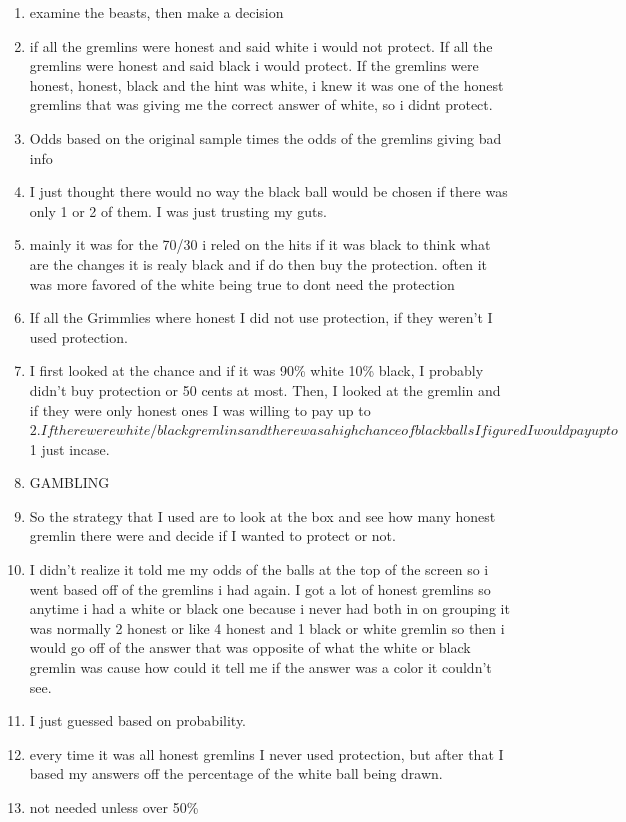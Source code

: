 \documentclass[12pt,a4paper]{article}
\begin{document}
\begin{appendices}
\begin{enumerate}
\item examine the beasts, then make a decision
\item if all the gremlins were honest and said white i would not protect. If all the gremlins were honest and said black i would protect. If the gremlins were honest, honest, black and the hint was white, i knew it was one of the honest gremlins that was giving me the correct answer of white, so i didnt protect.
\item Odds based on the original sample times the odds of the gremlins giving bad info
\item I just thought there would no way the black ball would be chosen if there was only 1 or 2 of them. I was just trusting my guts. 
\item mainly it was for the 70/30 i reled on the hits if it was black to think what are the changes it is realy black and if do then buy the protection. often it was more favored of the white being true to dont need the protection
\item If all the Grimmlies where honest I did not use protection, if they weren't I used protection. 
\item I first looked at the chance and if it was 90\% white 10\% black, I probably didn't buy protection or 50 cents at most. Then, I looked at the gremlin and if they were only honest ones I was willing to pay up to $2. If there were white/black gremlins and there was a high chance of black balls I figured I would pay up to $1 just incase. 
\item GAMBLING
\item So the strategy that I used are to look at the box and see how many honest gremlin there were and decide if I wanted to protect or not. 
\item I didn't realize it told me my odds of the balls at the top of the screen so i went based off of the gremlins i had again. I got a lot of honest gremlins so anytime i had a white or black one because i never had both in on grouping it was normally 2 honest or like 4 honest and 1 black or white gremlin so then i would go off of the answer that was opposite of what the white or black gremlin was cause how could it tell me if the answer was a color it couldn't see.
\item I just guessed based on probability. 
\item every time it was all honest gremlins I never used protection, but after that I based my answers off the percentage of the white ball being drawn.
\item not needed unless over 50\%

\end{enumerate}
\end{appendices}
\end{document}

